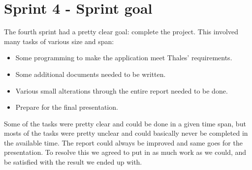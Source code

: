 \section{Sprint 4 - Sprint goal}
The fourth sprint had a pretty clear goal: complete the project. This involved many tasks of various size and span:

\begin{itemize}
\item{}Some programming to make the application meet Thales’ requirements.
\item{}Some additional documents needed to be written.
\item{}Various small alterations through the entire report needed to be done.
\item{}Prepare for the final presentation.
\end{itemize}

Some of the tasks were pretty clear and could be done in a given time span, but mosts of the tasks were pretty unclear and could basically never be completed in the available time. The report could always be improved and same goes for the presentation. To resolve this we agreed to put in as much work as we could, and be satisfied with the result we ended up with. 